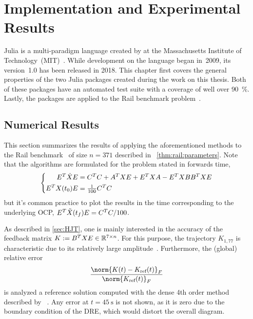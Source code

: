 \chapter{Implementation and Experimental Results}
\label{sec:impl}

Julia is a multi-paradigm language created by \citeauthor{Julia} at the Massachusetts Institute of Technology~(MIT)~\cite{Julia}.
While development on the language began in~2009, its version~1.0 has been released in 2018.
This chapter first covers the general properties of the two Julia packages created during the work on this thesis.
Both of these packages have an automated test suite with a coverage of well over \SI{90}{\percent}.
Lastly, the packages are applied to the Rail benchmark problem~\cite{morwiki_steel}.




\section{Numerical Results}

This section summarizes the results of applying the aforementioned methods to
the Rail benchmark~\cite{morwiki_steel} of size $n=371$
described in \eg~\autoref{thm:rail:parameters}.
Note that the algorithms are formulated for the problem stated in forwards time,
\begin{equation}
\left\{
\begin{aligned}
  E^T \dot X E &= C^T C + A^T X E + E^T X A - E^T X BB^T X E \\
  E^T X(t_0) E &= \tfrac{1}{100} C^T C
\end{aligned}
\right.
\end{equation}
but it's common practice to plot the results in the time corresponding to the underlying \ac{OCP},
\ie $E^T \tilde X(t_f) E = C^T C/100$.

As described in \autoref{sec:HJT},
one is mainly interested in the accuracy of the feedback matrix
$
  K := B^T X E \in \mathbb{R}^{7 \times n}
$.
For this purpose, the trajectory $K_{1,77}$ is characteristic due to its relatively large amplitude~\cite{Lang2015}.
Furthermore, the (global) relative error
\begin{equation}
\label{eq:results:err:ref}
  \frac{\norm{K(t) - K_\text{ref}(t)}_F}{\norm{K_\text{ref}(t)}_F}
\end{equation}
is analyzed \wrt a reference solution computed with the dense 4th order method described by \citeauthor{Lang2017}~\cite[Appendix~A]{Lang2017}.
Any error at $t=\SI{45}{\second}$ is not shown,
as it is zero due to the boundary condition of the \ac{DRE},
which would distort the overall diagram.


